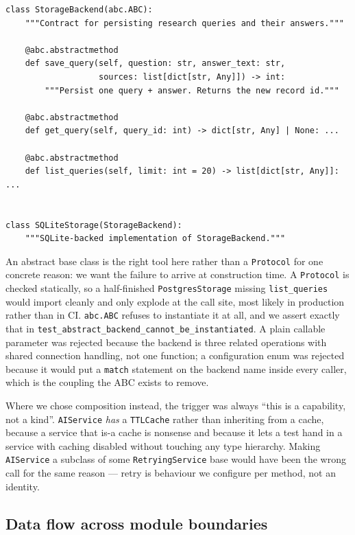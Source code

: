 \documentclass[11pt,a4paper]{article}
\begin{document}
\begin{lstlisting}[style=python]
class StorageBackend(abc.ABC):
    """Contract for persisting research queries and their answers."""

    @abc.abstractmethod
    def save_query(self, question: str, answer_text: str,
                   sources: list[dict[str, Any]]) -> int:
        """Persist one query + answer. Returns the new record id."""

    @abc.abstractmethod
    def get_query(self, query_id: int) -> dict[str, Any] | None: ...

    @abc.abstractmethod
    def list_queries(self, limit: int = 20) -> list[dict[str, Any]]: ...


class SQLiteStorage(StorageBackend):
    """SQLite-backed implementation of StorageBackend."""
\end{lstlisting}

An abstract base class is the right tool here rather than a \texttt{Protocol} for one concrete
reason: we want the failure to arrive at construction time. A \texttt{Protocol} is checked
statically, so a half-finished \texttt{PostgresStorage} missing \texttt{list\_queries} would
import cleanly and only explode at the call site, most likely in production rather than in CI.
\texttt{abc.ABC} refuses to instantiate it at all, and we assert exactly that in
\texttt{test\_abstract\_backend\_cannot\_be\_instantiated}. A plain callable parameter was
rejected because the backend is three related operations with shared connection handling, not
one function; a configuration enum was rejected because it would put a \texttt{match} statement
on the backend name inside every caller, which is the coupling the ABC exists to remove.

Where we chose composition instead, the trigger was always ``this is a capability, not a kind''.
\texttt{AIService} \emph{has} a \texttt{TTLCache} rather than inheriting from a cache, because a
service that is-a cache is nonsense and because it lets a test hand in a service with caching
disabled without touching any type hierarchy. Making \texttt{AIService} a subclass of some
\texttt{RetryingService} base would have been the wrong call for the same reason --- retry is
behaviour we configure per method, not an identity.

\subsection{Data flow across module boundaries}
\end{document}
